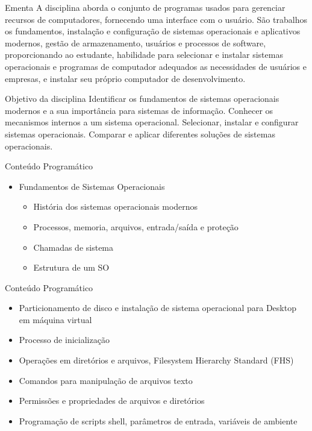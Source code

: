 \documentclass{beamer}
\begin{document}
\begin{frame}{Ementa}\justifying
      A disciplina aborda o conjunto de programas usados para gerenciar recursos de computadores, fornecendo uma interface com o usuário. 
      São trabalhos os fundamentos, instalação e configuração de sistemas operacionais e aplicativos modernos, gestão de armazenamento, 
      usuários e processos de software, proporcionando ao estudante, habilidade para selecionar
      e instalar sistemas operacionais e programas de computador adequados as necessidades 
      de usuários e empresas, e instalar seu próprio computador de desenvolvimento.
\end{frame}

\begin{frame}{Objetivo da disciplina}\justifying
      Identificar os fundamentos de sistemas operacionais modernos e a sua importância para sistemas de informação. Conhecer os mecanismos internos a um sistema operacional. Selecionar, instalar e configurar sistemas operacionais. Comparar e aplicar diferentes soluções de sistemas operacionais.
\end{frame}

\begin{frame}{Conteúdo Programático}\justifying
      \begin{itemize}
            \item Fundamentos de Sistemas Operacionais
                  \begin{itemize}
                        \item História dos sistemas operacionais modernos 
                        \item Processos, memoria, arquivos, entrada/saída e proteção
                        \item Chamadas de sistema
                        \item Estrutura de um SO
                  \end{itemize}
            
            
      \end{itemize}
\end{frame}

\begin{frame}{Conteúdo Programático}\justifying
      \begin{itemize}
            \item Particionamento de disco e instalação de sistema operacional para Desktop em máquina virtual
            \item Processo de inicialização
            \item Operações em diretórios e arquivos, Filesystem Hierarchy Standard (FHS)
            \item Comandos para manipulação de arquivos texto
            \item Permissões e propriedades de arquivos e diretórios
            \item Programação de scripts shell, parâmetros de entrada, variáveis de ambiente
           
      \end{itemize}
\end{frame}
\end{document}
